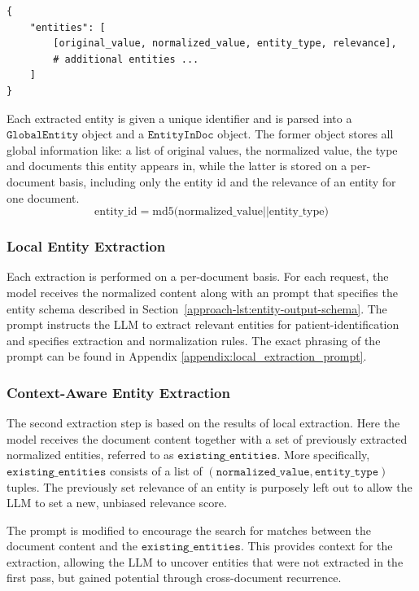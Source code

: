 \begin{lstlisting}[caption={Response JSON schema},label={approach-lst:entity-output-schema}]
{
    "entities": [
        [original_value, normalized_value, entity_type, relevance],
        # additional entities ...
    ]
}
\end{lstlisting}

Each extracted entity is given a unique identifier and is parsed into a $\texttt{GlobalEntity}$ object and a $\texttt{EntityInDoc}$ object. The former object stores all global information like: a list of original values, the normalized value, the type and documents this entity appears in, while the latter is stored on a per-document basis, including only the entity id and the relevance of an entity for one document.
\[\mbox{entity\_id} = \mbox{md5(normalized\_value} \vert\vert \mbox{entity\_type)}\]



\subsubsection{Local Entity Extraction}
Each extraction is performed on a per-document basis. For each request, the model receives the normalized content along with an prompt that specifies the entity schema described in Section~\ref{approach-lst:entity-output-schema}. The prompt instructs the LLM to extract relevant entities for patient-identification and specifies extraction and normalization rules. The exact phrasing of the prompt can be found in Appendix \ref{appendix:local_extraction_prompt}.


\subsubsection{Context-Aware Entity Extraction}\label{approach-subsubsec:context_extract}
The second extraction step is based on the results of local extraction. Here the model receives the document content together with a set of previously extracted normalized entities, referred to as $\texttt{existing\_entities}$. More specifically, $\texttt{existing\_entities}$ consists of a list of $(\texttt{normalized\_value}, \texttt{entity\_type})$ tuples. The previously set relevance of an entity is purposely left out to allow the LLM to set a new, unbiased relevance score.

The prompt is modified to encourage the search for matches between the document content and the $\texttt{existing\_entities}$. This provides context for the extraction, allowing the LLM to uncover entities that were not extracted in the first pass, but gained potential through cross-document recurrence. 

